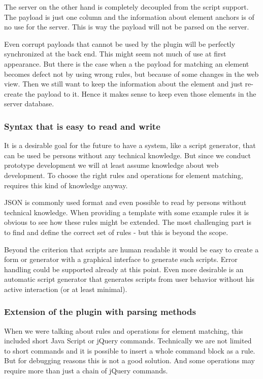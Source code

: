 The server on the other hand is completely decoupled from the script support. The payload is just one column and the information about element anchors is of no use for the server. This is way the payload will not be parsed on the server. 

Even corrupt payloads that cannot be used by the plugin will be perfectly synchronized at the back end. This might seem not much of use at first appearance. But there is the case when a the payload for matching an element becomes defect not by using wrong rules, but because of some changes in the web view. Then we still want to keep the information about the element and just re-create the payload to it. Hence it makes sense to keep even those elements in the server database.

\subsubsection{Syntax that is easy to read and write}

It is a desirable goal for the future to have a system, like a script generator, that can be used be persons without any technical knowledge. But since we conduct prototype development we will at least assume knowledge about web development. To choose the right rules and operations for element matching, requires this kind of knowledge anyway. 

JSON is commonly used format and even possible to read by persons without technical knowledge. When providing a template with some example rules it is obvious to see how these rules might be extended. 
The most challenging part is to find and define the correct set of rules - but this is beyond the scope. 

Beyond the criterion that scripts are human readable it would be easy to create a form or generator with a graphical interface to generate such scripts. Error handling could be supported already at this point. Even more desirable is an automatic script generator that generates scripts from user behavior without his active interaction (or at least minimal). 

\subsubsection{Extension of the plugin with parsing methods}

When we were talking about rules and operations for element matching, this included short Java Script or jQuery commands. Technically we are not limited to short commands and it is possible to insert a whole command block as a rule. But for debugging reasons this is not a good solution. And some operations may require more than just a chain of jQuery commands. 


